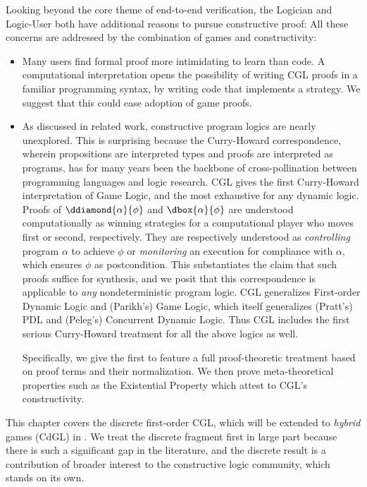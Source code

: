 \documentclass[12pt]{cmuthesis}
\theoremstyle{definition}
\theoremstyle{remark}
\newcommand{\rref}[2][]{\prettyref{#2}}
\newcommand{\CGL}{\textsf{CGL}\xspace}
\newcommand{\CdGL}{\textsf{CdGL}\xspace}
\begin{document}
Looking beyond the core theme of end-to-end verification, the Logician and Logic-User both have additional reasons to pursue constructive proof:
All these concerns are addressed by the combination of games and constructivity:
\begin{itemize}
\item
Many users find formal proof more intimidating to learn than code.
A computational interpretation opens the possibility of writing \CGL proofs in a familiar programming syntax, by writing code that implements a strategy.
We suggest that this could ease adoption of game proofs.
\item
As discussed in related work, constructive program logics are nearly unexplored.
This is surprising because the Curry-Howard correspondence, wherein propositions are interpreted types and proofs are interpreted as programs, has for many years been the backbone of cross-pollination between programming languages and logic research.
\CGL gives the first Curry-Howard interpretation of Game Logic, and the most exhaustive for any dynamic logic.
Proofs of $\ddiamond{\alpha}{\phi}$ and $\dbox{\alpha}{\phi}$ are understood computationally as winning strategies for a computational player who moves first or second, respectively.
They are respectively understood as \emph{controlling} program $\alpha$ to achieve $\phi$ or \emph{monitoring} an execution for compliance with $\alpha,$ which ensures $\phi$ as postcondition.
This substantiates the claim that such proofs suffice for synthesis, and we posit that this correspondence is applicable to \emph{any} nondeterministic program logic.
\CGL generalizes  First-order Dynamic Logic and (Parikh's) Game Logic, which itself generalizes (Pratt's) PDL and (Peleg's) Concurrent Dynamic Logic.
Thus \CGL includes the first serious Curry-Howard treatment for all the above logics as well.

Specifically, we give the first to feature a full proof-theoretic treatment based on proof terms and their normalization.
We then prove meta-theoretical properties such as the Existential Property which attest to \CGL's constructivity.
\end{itemize}

This chapter covers the discrete first-order \CGL, which will be extended to \emph{hybrid} games (\CdGL) in \rref{sec:cdgl}.
We treat the discrete fragment first in large part because there is such a significant gap in the literature, and the discrete result is a contribution of broader interest to the constructive logic community, which stands on its own.
\end{document}
